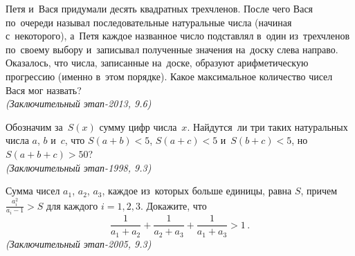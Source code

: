 \begin{problems}
\item
Петя и~Вася придумали десять квадратных трехчленов.
После чего Вася по~очереди называл последовательные натуральные числа
(начиная с~некоторого), а~Петя каждое названное число подставлял в~один
из~трехчленов по~своему выбору и~записывал полученные значения на~доску слева
направо.
Оказалось, что числа, записанные на~доске, образуют арифметическую прогрессию
(именно в~этом порядке).
Какое максимальное количество чисел Вася мог назвать?
\\\emph{(Заключительный этап-2013, 9.6)}

\item
Обозначим за~$S(x)$ сумму цифр числа~$x$.
Найдутся~ли три таких натуральных числа $a$, $b$ и~$c$, что
$S(a + b) < 5$, $S(a + c) < 5$ и~$S(b + c) < 5$, но~$S(a + b + c) > 50$?
\\\emph{(Заключительный этап-1998, 9.3)}

\item
Сумма чисел $a_1$, $a_2$, $a_3$, каждое из~которых больше единицы, равна $S$,
причем $\frac{a_i^2}{a_i - 1} > S$ для каждого $i = 1, 2, 3$.
Докажите, что
\[
    \frac{1}{a_1 + a_2} + \frac{1}{a_2 + a_3} + \frac{1}{a_1 + a_3}
>
    1
\, . \]
\emph{(Заключительный этап-2005, 9.3)}

\end{problems}

